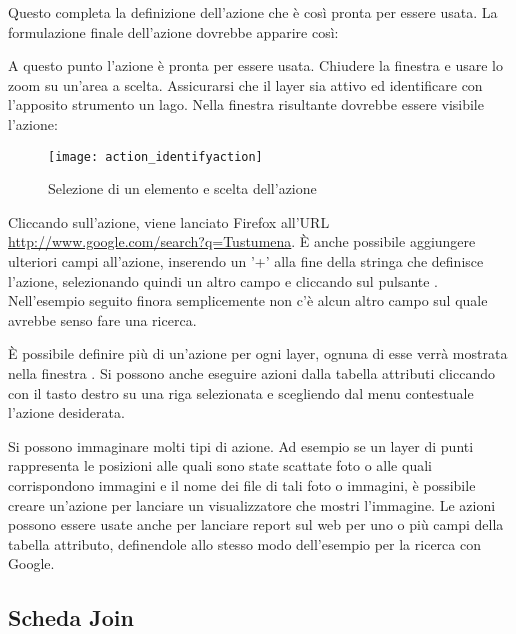 Questo completa la definizione dell'azione che è così pronta per essere usata.
La formulazione finale dell'azione dovrebbe apparire così:

\begin{center}
\end{center}

A questo punto l'azione è pronta per essere usata. Chiudere la finestra
 e usare lo zoom su un'area a scelta. Assicurarsi
che il layer  sia attivo ed identificare con l'apposito
strumento un lago. Nella finestra risultante dovrebbe essere visibile l'azione:

\begin{figure}[ht]
   \begin{center}
   \caption{Selezione di un elemento e scelta dell'azione \nixcaption}\label{fig:identify_action}\smallskip
   \texttt{[image: action\_identifyaction]} 
\end{center}  
\end{figure}

Cliccando sull'azione, viene lanciato Firefox all'URL
\url{http://www.google.com/search?q=Tustumena}. È anche possibile aggiungere
ulteriori campi all'azione, inserendo un '+' alla fine della stringa che
definisce l'azione, selezionando quindi un altro campo e cliccando sul
pulsante . Nell'esempio seguito finora semplicemente non c'è alcun
altro campo sul quale avrebbe senso fare una ricerca.

È possibile definire più di un'azione per ogni layer, ognuna di esse verrà
mostrata nella finestra . Si possono anche
eseguire azioni dalla tabella attributi cliccando con il tasto destro su una
riga selezionata e scegliendo dal menu contestuale l'azione desiderata.

Si possono immaginare molti tipi di azione. Ad esempio se un layer di punti
rappresenta le posizioni alle quali sono state scattate foto o alle quali
corrispondono immagini e il nome dei file di tali foto o immagini, è possibile
creare un'azione per lanciare un visualizzatore che mostri l'immagine. Le
azioni possono essere usate anche per lanciare report sul web per uno o più
campi della tabella attributo, definendole allo stesso modo dell'esempio per la ricerca con Google.

\subsection{Scheda Join}\label{sec:joins}

